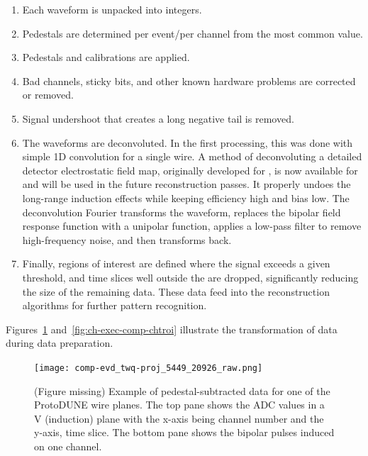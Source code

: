 \begin{enumerate}
\item Each waveform is unpacked into integers.
\item Pedestals are determined per event/per channel from the most common  value. 
\item Pedestals and calibrations are applied. %
\item Bad channels, sticky bits, and other known hardware problems are corrected or removed.
\item Signal undershoot that creates a long negative tail is removed. 
\item The waveforms  are deconvoluted.  In the first processing, this was done with simple 1D  convolution for a single wire.  A \twod  method of deconvoluting a detailed detector electrostatic field map, originally developed for \cite{Adams:2018dra}, is  now available for  and will be used in the future reconstruction passes.  It properly undoes the long-range induction effects while keeping efficiency high and bias low.  The deconvolution Fourier transforms the waveform, replaces the  bipolar field response function with a unipolar function, applies a low-pass filter to remove high-frequency noise, and then transforms back.





\item Finally, regions of interest are defined where the signal exceeds a given threshold, and time slices well outside the  are dropped, significantly reducing the size of the remaining data. These data feed into the reconstruction algorithms for further pattern recognition. %
\end{enumerate}


Figures~\ref{fig:ch-exec-comp-chtraw} and~\ref{fig:ch-exec-comp-chtroi} illustrate the transformation of  data  during data preparation.

\begin{figure}[t]
\texttt{[image: comp-evd\_twq-proj\_5449\_20926\_raw.png]}
\caption{
(Figure missing) Example of pedestal-subtracted data for one of the ProtoDUNE  wire planes.  The top pane shows the ADC values in a V (induction) plane with the x-axis being channel number and the y-axis, time slice. The bottom pane shows the bipolar pulses induced on one channel. 
}
\label{fig:ch-exec-comp-chtraw}
\end{figure}


